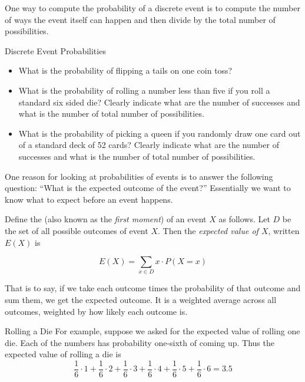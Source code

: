 One way to compute the probability of a discrete event is to compute the number of ways the event itself can happen and then divide by the total number of possibilities.
\begin{exercise}{Discrete Event Probabilities \Coffeecup}
\begin{itemize}
\item  What is the probability of flipping a tails on one coin toss?  

\vspace*{1in}

\item What is the probability of rolling a number less than five if you roll a standard six sided die?  Clearly indicate what are the number of successes and what is the number of total number of possibilities.

\vspace*{1in}

\item What is the probability of picking a queen if you randomly draw one card out of a standard deck of 52 cards?  Clearly indicate what are the number of successes and what is the number of total number of possibilities.

\vspace*{1in}
\end{itemize}
\end{exercise}

One reason for looking at probabilities of events is to answer the following question: ``What is the expected outcome of the event?''  Essentially we want to know what to expect before an event happens.  
\begin{definition}{}
Define the \emph{} (also known as the \emph{first moment}) of an event $X$ as follows.  Let $D$ be the set of all possible outcomes of event $X$.  Then the  \emph{expected value of $X$}, written $E(X)$ is 

$$ E(X) = \sum_{x \in D} x \cdot P(X=x) $$
\end{definition}

That is to say, if we take each outcome times the probability of that outcome and sum them, we get the expected outcome.  It is a weighted average across all outcomes, weighted by how likely each outcome is.
\begin{example}{Rolling a Die}
For example, suppose we asked for the expected value of rolling one die.  Each of the numbers has probability one-sixth of coming up.  Thus the expected value of rolling a die is $$\frac{1}{6}\cdot 1 +\frac{1}{6}\cdot 2 + \frac{1}{6}\cdot 3 +\frac{1}{6}\cdot 4 +\frac{1}{6}\cdot 5 +\frac{1}{6}\cdot 6 = 3.5$$
\end{example}

